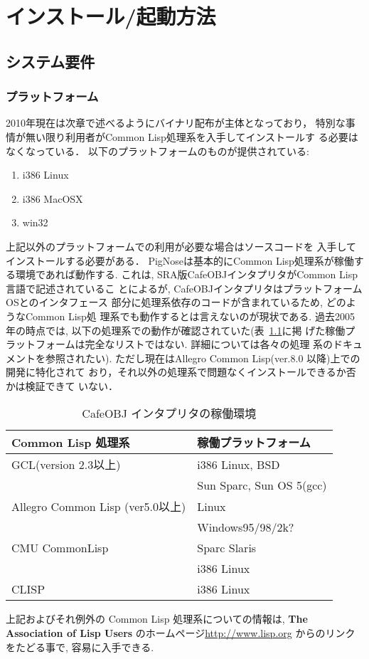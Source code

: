 \chapter{インストール/起動方法}
\section{システム要件}
\label{sec:system-req}

\subsection{プラットフォーム}
\label{sec:platform}

2010年現在は次章で述べるようにバイナリ配布が主体となっており，
特別な事情が無い限り利用者がCommon Lisp処理系を入手してインストールす
る必要はなくなっている．
以下のプラットフォームのものが提供されている:
\begin{enumerate}
\item i386 Linux
\item i386 MacOSX
\item win32
\end{enumerate}

上記以外のプラットフォームでの利用が必要な場合はソースコードを
入手してインストールする必要がある．
PigNoseは基本的にCommon Lisp処理系が稼働する環境であれば動作する.
これは, SRA版CafeOBJインタプリタがCommon Lisp言語で記述されているこ
とによるが, CafeOBJインタプリタはプラットフォームOSとのインタフェース
部分に処理系依存のコードが含まれているため, どのようなCommon Lisp処
理系でも動作するとは言えないのが現状である.
過去2005年の時点では, 
以下の処理系での動作が確認されていた(表~\ref{tab:platform}に掲
げた稼働プラットフォームは完全なリストではない. 詳細については各々の処理
系のドキュメントを参照されたい). 
ただし現在はAllegro Common Lisp(ver.8.0 以降)上での開発に特化されて
おり，それ以外の処理系で問題なくインストールできるか否かは検証できて
いない．
\begin{table}[htbp]
  \begin{center}
    \begin{tabular}{|l|l|}\hline
      Common Lisp 処理系 & 稼働プラットフォーム\\\hline\hline
      GCL(version 2.3以上) 
      & i386 Linux, BSD \\
      & Sun Sparc, Sun OS 5(gcc) \\\hline
      Allegro Common Lisp (ver5.0以上) & Linux \\
      & Windows95/98/2k? \\\hline
      CMU CommonLisp & Sparc Slaris \\
      & i386 Linux \\\hline
      CLISP & i386 Linux \\\hline
    \end{tabular}
    \caption{{CafeOBJ インタプリタの稼働環境}}
    \label{tab:platform}
  \end{center}
\end{table}
上記およびそれ例外の Common Lisp 処理系についての情報は, \textbf{The
  Association of Lisp Users} のホームページ\url{http://www.lisp.org}
からのリンクをたどる事で, 容易に入手できる. 

